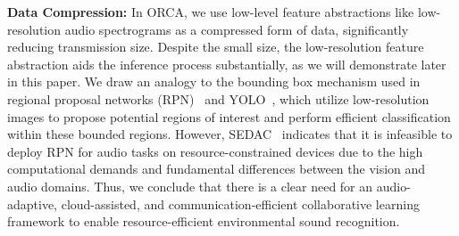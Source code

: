 \noindent
\textbf{Data Compression:}
 In ORCA, we use low-level feature abstractions like low-resolution audio spectrograms as a compressed form of data, significantly reducing transmission size. Despite the small size, the low-resolution feature abstraction aids the inference process substantially, as we will demonstrate later in this paper. We draw an analogy to the bounding box mechanism used in regional proposal networks (RPN)~\cite{ren2015faster} and YOLO~\cite{redmon2016you}, which utilize low-resolution images to propose potential regions of interest and perform efficient classification within these bounded regions. However, SEDAC~\cite{ahn2024split} indicates that it is infeasible to deploy RPN for audio tasks on resource-constrained devices due to the high computational demands and fundamental differences between the vision and audio domains. Thus, we conclude that there is a clear need for an audio-adaptive, cloud-assisted, and communication-efficient collaborative learning framework to enable resource-efficient environmental sound recognition.


